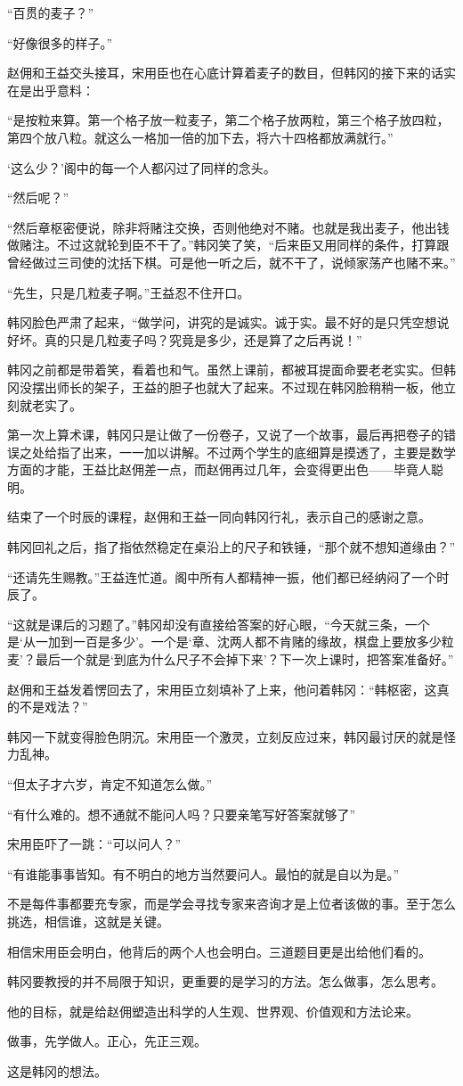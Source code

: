 “百贯的麦子？”

“好像很多的样子。”

赵佣和王益交头接耳，宋用臣也在心底计算着麦子的数目，但韩冈的接下来的话实在是出乎意料：

“是按粒来算。第一个格子放一粒麦子，第二个格子放两粒，第三个格子放四粒，第四个放八粒。就这么一格加一倍的加下去，将六十四格都放满就行。”

‘这么少？’阁中的每一个人都闪过了同样的念头。

“然后呢？”

“然后章枢密便说，除非将赌注交换，否则他绝对不赌。也就是我出麦子，他出钱做赌注。不过这就轮到臣不干了。”韩冈笑了笑，“后来臣又用同样的条件，打算跟曾经做过三司使的沈括下棋。可是他一听之后，就不干了，说倾家荡产也赌不来。”

“先生，只是几粒麦子啊。”王益忍不住开口。

韩冈脸色严肃了起来，“做学问，讲究的是诚实。诚于实。最不好的是只凭空想说好坏。真的只是几粒麦子吗？究竟是多少，还是算了之后再说！”

韩冈之前都是带着笑，看着也和气。虽然上课前，都被耳提面命要老老实实。但韩冈没摆出师长的架子，王益的胆子也就大了起来。不过现在韩冈脸稍稍一板，他立刻就老实了。

第一次上算术课，韩冈只是让做了一份卷子，又说了一个故事，最后再把卷子的错误之处给指了出来，一一加以讲解。不过两个学生的底细算是摸透了，主要是数学方面的才能，王益比赵佣差一点，而赵佣再过几年，会变得更出色——毕竟人聪明。

结束了一个时辰的课程，赵佣和王益一同向韩冈行礼，表示自己的感谢之意。

韩冈回礼之后，指了指依然稳定在桌沿上的尺子和铁锤，“那个就不想知道缘由？”

“还请先生赐教。”王益连忙道。阁中所有人都精神一振，他们都已经纳闷了一个时辰了。

“这就是课后的习题了。”韩冈却没有直接给答案的好心眼，“今天就三条，一个是‘从一加到一百是多少’。一个是‘章、沈两人都不肯赌的缘故，棋盘上要放多少粒麦’？最后一个就是‘到底为什么尺子不会掉下来’？下一次上课时，把答案准备好。”

赵佣和王益发着愣回去了，宋用臣立刻填补了上来，他问着韩冈：“韩枢密，这真的不是戏法？”

韩冈一下就变得脸色阴沉。宋用臣一个激灵，立刻反应过来，韩冈最讨厌的就是怪力乱神。

“但太子才六岁，肯定不知道怎么做。”

“有什么难的。想不通就不能问人吗？只要亲笔写好答案就够了”

宋用臣吓了一跳：“可以问人？”

“有谁能事事皆知。有不明白的地方当然要问人。最怕的就是自以为是。”

不是每件事都要充专家，而是学会寻找专家来咨询才是上位者该做的事。至于怎么挑选，相信谁，这就是关键。

相信宋用臣会明白，他背后的两个人也会明白。三道题目更是出给他们看的。

韩冈要教授的并不局限于知识，更重要的是学习的方法。怎么做事，怎么思考。

他的目标，就是给赵佣塑造出科学的人生观、世界观、价值观和方法论来。

做事，先学做人。正心，先正三观。

这是韩冈的想法。

